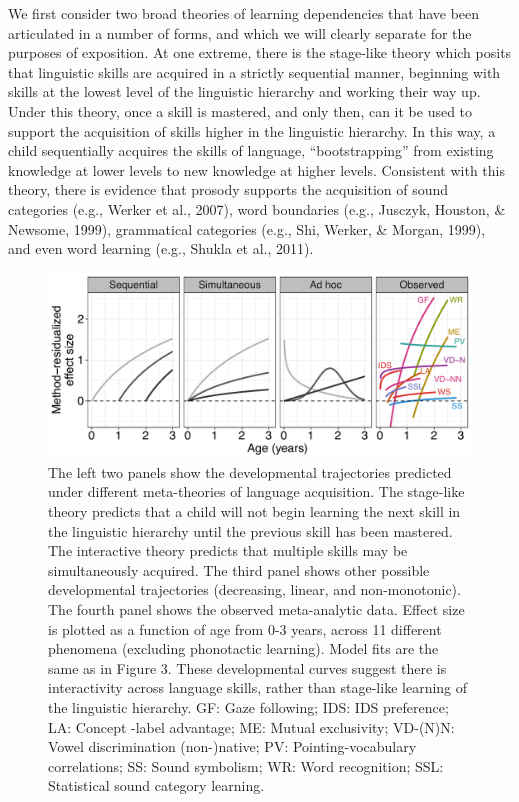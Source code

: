 \documentclass[english,floatsintext,man]{apa6}
\theoremstyle{definition}
\theoremstyle{definition}
\theoremstyle{remark}
\begin{document}
We first consider two broad theories of learning dependencies that have
been articulated in a number of forms, and which we will clearly
separate for the purposes of exposition. At one extreme, there is the
stage-like theory which posits that linguistic skills are acquired in a
strictly sequential manner, beginning with skills at the lowest level of
the linguistic hierarchy and working their way up. Under this theory,
once a skill is mastered, and only then, can it be used to support the
acquisition of skills higher in the linguistic hierarchy. In this way, a
child sequentially acquires the skills of language,
\enquote{bootstrapping} from existing knowledge at lower levels to new
knowledge at higher levels. Consistent with this theory, there is
evidence that prosody supports the acquisition of sound categories
(e.g., Werker et al., 2007), word boundaries (e.g., Jusczyk, Houston, \&
Newsome, 1999), grammatical categories (e.g., Shi, Werker, \& Morgan,
1999), and even word learning (e.g., Shukla et al., 2011).

\begin{figure}
\centering
\includegraphics{figs/fig4_lab.pdf}
\caption{\label{fig:unnamed-chunk-7}The left two panels show the
developmental trajectories predicted under different meta-theories of
language acquisition. The stage-like theory predicts that a child will
not begin learning the next skill in the linguistic hierarchy until the
previous skill has been mastered. The interactive theory predicts that
multiple skills may be simultaneously acquired. The third panel shows
other possible developmental trajectories (decreasing, linear, and
non-monotonic). The fourth panel shows the observed meta-analytic data.
Effect size is plotted as a function of age from 0-3 years, across 11
different phenomena (excluding phonotactic learning). Model fits are the
same as in Figure 3. These developmental curves suggest there is
interactivity across language skills, rather than stage-like learning of
the linguistic hierarchy. GF: Gaze following; IDS: IDS preference; LA:
Concept -label advantage; ME: Mutual exclusivity; VD-(N)N: Vowel
discrimination (non-)native; PV: Pointing-vocabulary correlations; SS:
Sound symbolism; WR: Word recognition; SSL: Statistical sound category
learning.}
\end{figure}
\end{document}
